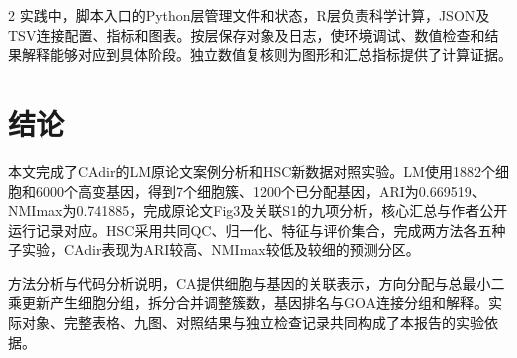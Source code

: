 \begin{multicols}{2}
实践中，脚本入口的Python层管理文件和状态，R层负责科学计算，JSON及TSV连接配置、指标和图表。按层保存对象及日志，使环境调试、数值检查和结果解释能够对应到具体阶段。独立数值复核则为图形和汇总指标提供了计算证据。

\section{结论}
本文完成了CAdir的LM原论文案例分析和HSC新数据对照实验。LM使用\allowbreak{}1882个细胞和\allowbreak{}6000个高变基因，得到\allowbreak{}7个细胞簇、1200个已分配基因，ARI为\allowbreak{}0.669519、NMImax为\allowbreak{}0.741885，完成原论文Fig3及关联S1的九项分析，核心汇总与作者公开运行记录对应。HSC采用共同QC、归一化、特征与评价集合，完成两方法各五种子实验，CAdir表现为ARI较高、NMImax较低及较细的预测分区。

方法分析与代码分析说明，CA提供细胞与基因的关联表示，方向分配与总最小二乘更新产生细胞分组，拆分合并调整簇数，基因排名与GOA连接分组和解释。实际对象、完整表格、九图、对照结果与独立检查记录共同构成了本报告的实验依据。
\end{multicols}
\par
